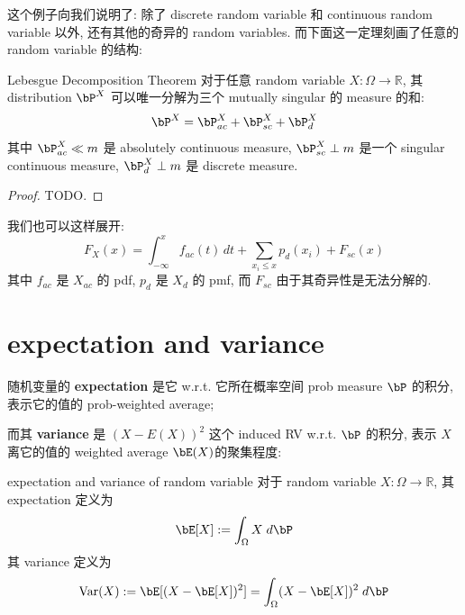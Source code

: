 
这个例子向我们说明了: 除了 discrete random variable 和 continuous random variable 以外, 
还有其他的奇异的 random variables. 而下面这一定理刻画了任意的 random variable 的结构:

\begin{theorem}{Lebesgue Decomposition Theorem}
    对于任意 random variable \(X: \Omega \to \mathbb{R}\), 
    其 distribution \(\bP^X\) 可以唯一分解为三个 mutually singular 的 measure 的和:
    \[
    \bP^X = \bP^X_{ac} + \bP^X_{sc} + \bP^X_{d}
    \]
    其中 \(\bP^X_{ac} \ll m\) 是 absolutely continuous measure, 
    \(\bP^X_{sc} \perp m\) 是一个 singular continuous measure, 
    \(\bP^X_d \perp m\) 是 discrete measure.
\end{theorem}
\begin{proof}
    TODO.
\end{proof}
\begin{remark}
    我们也可以这样展开:
    $$ F_X(x) = \int_{-\infty}^x f_{ac}(t) \, dt + \sum_{x_i \le x} p_{d}(x_i) + F_{sc}(x) $$
其中 \(f_{ac}\) 是 \(X_{ac}\) 的 pdf, \(p_d\) 是 \(X_d\) 的 pmf, 而 \(F_{sc}\) 由于其奇异性是无法分解的.
\end{remark}


\section{expectation and variance}

随机变量的 \textbf{expectation} 是它 w.r.t. 它所在概率空间 prob measure \(\bP\) 的积分, 
表示它的值的 prob-weighted average; 

而其 \textbf{variance} 是 $(X-E(X))^2$ 这个 induced RV w.r.t. \(\bP\) 的积分, 
表示 \(X\) 离它的值的 weighted average \(\bE(X)\)的聚集程度:

\begin{definition}{expectation and variance of random variable}
    对于 random variable \(X: \Omega \to \mathbb{R}\), 
    其 expectation 定义为
    \[
    \bE[X] := \int_\Omega X \;d\bP
    \]
    其 variance 定义为
    \[
    \text{Var}(X) := \bE[(X-\bE[X])^2] = \int_\Omega (X-\bE[X])^2   \;d\bP
    \]
    
\end{definition}

